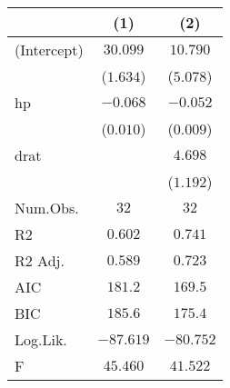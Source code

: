 \begin{table}
\centering
\begin{tabular}[t]{lcc}
\toprule
  & (1) & (2)\\
\midrule
(Intercept) & $30.099$ & $10.790$\\
 & ($1.634$) & ($5.078$)\\
hp & $-0.068$ & $-0.052$\\
 & ($0.010$) & ($0.009$)\\
drat &  & $4.698$\\
 &  & ($1.192$)\\
\midrule
Num.Obs. & $32$ & $32$\\
R2 & $0.602$ & $0.741$\\
R2 Adj. & $0.589$ & $0.723$\\
AIC & $181.2$ & $169.5$\\
BIC & $185.6$ & $175.4$\\
Log.Lik. & $-87.619$ & $-80.752$\\
F & $45.460$ & $41.522$\\
\bottomrule
\end{tabular}
\end{table}
